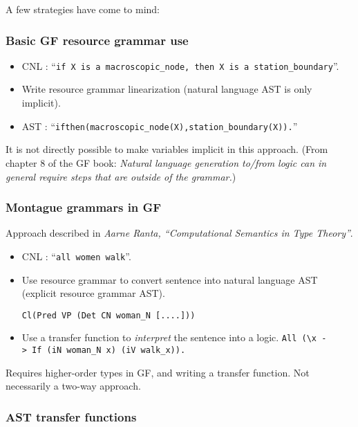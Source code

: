 \documentclass[]{article}
\providecommand{\tightlist}{%
  \setlength{\itemsep}{0pt}\setlength{\parskip}{0pt}}
\begin{document}
A few strategies have come to mind:

\subsubsection{Basic GF resource grammar
use}\label{basic-gf-resource-grammar-use}

\begin{itemize}
\tightlist
\item
  CNL :
  ``\texttt{if\ X\ is\ a\ macroscopic\_node,\ then\ X\ is\ a\ station\_boundary}''.
\item
  Write resource grammar linearization (natural language AST is only
  implicit).
\item
  AST : ``\texttt{ifthen(macroscopic\_node(X),station\_boundary(X)).}''
\end{itemize}

It is not directly possible to make variables implicit in this approach.
(From chapter 8 of the GF book: \emph{Natural language generation
to/from logic can in general require steps that are outside of the
grammar.})

\subsubsection{Montague grammars in GF}\label{montague-grammars-in-gf}

Approach described in \emph{Aarne Ranta, ``Computational Semantics in
Type Theory''}.

\begin{itemize}
\item
  CNL : ``\texttt{all\ women\ walk}''.
\item
  Use resource grammar to convert sentence into natural language AST
  (explicit resource grammar AST).

  \texttt{Cl(Pred\ VP\ (Det\ CN\ woman\_N\ {[}....{]}))}
\item
  Use a transfer function to \emph{interpret} the sentence into a logic.
  \texttt{All\ (\textbackslash{}x\ -\textgreater{}\ If\ (iN\ woman\_N\ x)\ (iV\ walk\_x)).}
\end{itemize}

Requires higher-order types in GF, and writing a transfer function. Not
necessarily a two-way approach.

\subsubsection{AST transfer functions}\label{ast-transfer-functions}
\end{document}

